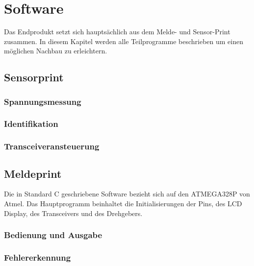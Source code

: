 \section{Software}
Das Endprodukt setzt sich hauptsächlich aus dem Melde- und Sensor-Print zusammen. In diesem
Kapitel werden alle Teilprogramme beschrieben um einen möglichen Nachbau zu erleichtern.
\subsection{Sensorprint}
\subsubsection{Spannungsmessung}
\subsubsection{Identifikation}
\subsubsection{Transceiveransteuerung}
\subsection{Meldeprint}
Die in Standard C geschriebene Software bezieht sich auf den ATMEGA328P von Atmel. Das Hauptprogramm beinhaltet die Initialisierungen der Pins, des LCD Display, des Transceivers und des Drehgebers.
\subsubsection{Bedienung und Ausgabe}
\subsubsection{Fehlererkennung}